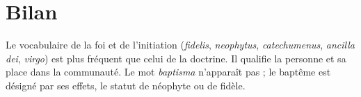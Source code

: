 \section{Bilan}

Le vocabulaire de la foi et de l’initiation (\emph{fidelis}, \emph{neophytus}, \emph{catechumenus}, \emph{ancilla dei}, \emph{virgo}) est plus fréquent que celui de la doctrine. Il qualifie la personne et sa place dans la communauté. Le mot \emph{baptisma} n’apparaît pas ; le baptême est désigné par ses effets, le statut de néophyte ou de fidèle.
